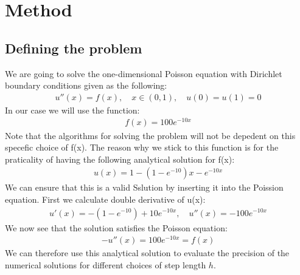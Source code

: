 \documentclass[american,a4paper,12pt]{article}
\begin{document}
\section{Method}
  \subsection{Defining the problem}
    We are going to solve the one-dimensional Poisson equation with Dirichlet boundary conditions given as the following:
    \begin{align*}
      u''(x) = f(x), \quad x \in (0,1), \quad u(0) = u(1) = 0
    \end{align*}
    In our case we will use the function:
    \begin{align*}
      f(x) = 100e^{-10x}
    \end{align*}
    Note that the algorithms for solving the problem will not be depedent on this specefic choice of f(x). The reason why we stick to this function is for the praticality of having the following analytical solution for f(x):
    \begin{align*}
      u(x) = 1 - (1 - e^{-10})x - e^{-10x}
    \end{align*}
    We can ensure that this is a valid Sslution by inserting it into the Poission equation. First we calculate double derivative of u(x):
    \begin{align*}
      u'(x) = -(1 - e^{-10}) + 10e^{-10x}, \quad u''(x) = -100e^{-10x}
    \end{align*}
    We now see that the solution satisfies the Poisson equation:
    \begin{align*}
      -u''(x) = 100e^{-10x} = f(x)
    \end{align*}
    We can therefore use this analytical solution to evaluate the precision of the numerical solutions for different choices of step length $h$.
\end{document}
